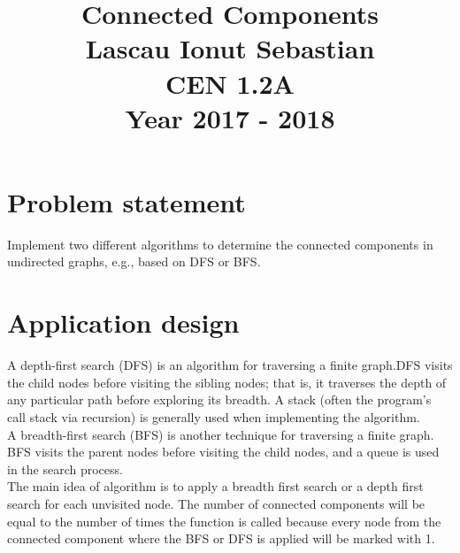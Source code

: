 \documentclass[14pt]{article}
\begin{document}
\date{}
\maketitle
\begin{center}
\title{\huge Connected Components}
\vspace{20 mm}
\title{\huge \\Lascau Ionut Sebastian}
\title{\huge \\CEN 1.2A}
\vspace{2 mm}
\title{\huge \\Year 2017 - 2018}
\maketitle



\newpage
\end{center}
\section*{Problem statement}
\hspace*{1cm} Implement two different algorithms to determine the connected components in undirected graphs, e.g., based on DFS or BFS.


\newpage
\section*{Application design}
\vspace{10 mm}
     \hspace*{1cm}A depth-first search (DFS) is an algorithm for traversing a finite graph.DFS visits the child nodes before visiting the sibling nodes; that is, it traverses the depth of any particular path before exploring its breadth. A stack (often the program's call stack via recursion) is generally used when implementing the algorithm.\\
    \hspace*{1cm}A breadth-first search (BFS) is another technique for traversing a finite graph. BFS visits the parent nodes before visiting the child nodes, and a queue is used in the search process.\\
     \hspace*{1cm}The main idea of algorithm is to apply a breadth first search or a depth first search for each unvisited node. The number of connected components will be equal to the number of times the function is called because every  
    node from the connected component where the BFS or DFS is applied will be marked with 1.
    
\end{document}
